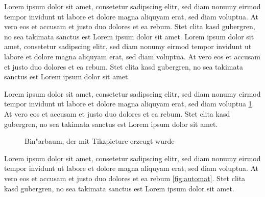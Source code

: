 \documentclass[12pt]{scrartcl}
\begin{document}


Lorem ipsum dolor sit amet, consetetur sadipscing elitr, sed diam nonumy eirmod tempor invidunt ut labore et dolore magna aliquyam erat, sed diam voluptua. At vero eos et accusam et justo duo dolores et ea rebum. Stet clita kasd gubergren, no sea takimata sanctus est Lorem ipsum dolor sit amet. Lorem ipsum dolor sit amet, consetetur sadipscing elitr, sed diam nonumy eirmod tempor invidunt ut labore et dolore magna aliquyam erat, sed diam voluptua. At vero eos et accusam et justo duo dolores et ea rebum. Stet clita kasd gubergren, no sea takimata sanctus est Lorem ipsum dolor sit amet.

Lorem ipsum dolor sit amet, consetetur sadipscing elitr, sed diam nonumy eirmod tempor invidunt ut labore et dolore magna aliquyam erat, sed diam voluptua \ref{fig:baum}. At vero eos et accusam et justo duo dolores et ea rebum. Stet clita kasd gubergren, no sea takimata sanctus est Lorem ipsum dolor sit amet.
\begin{figure}[!h]
\centering
{}
\caption{Bin"arbaum, der mit Tikzpicture erzeugt wurde}
\label{fig:baum}
\end{figure}
Lorem ipsum dolor sit amet, consetetur sadipscing elitr, sed diam nonumy eirmod tempor invidunt ut labore et dolore magna aliquyam erat, sed diam voluptua. At vero eos et accusam et justo duo dolores et ea rebum \ref{fig:automat}. Stet clita kasd gubergren, no sea takimata sanctus est Lorem ipsum dolor sit amet.
\end{document}
